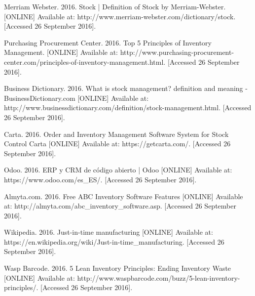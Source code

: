 \begin{thebibliography}{9}

Merriam Webster. 2016. Stock | Definition of Stock by Merriam-Webster. [ONLINE] Available at: http://www.merriam-webster.com/dictionary/stock. [Accessed 26 September 2016].

Purchasing Procurement Center. 2016. Top 5 Principles of Inventory Management. [ONLINE] Available at: http://www.purchasing-procurement-center.com/principles-of-inventory-management.html. [Accessed 26 September 2016].

Business Dictionary. 2016. What is stock management? definition and meaning - BusinessDictionary.com [ONLINE] Available at: http://www.businessdictionary.com/definition/stock-management.html. [Accessed 26 September 2016].

Carta. 2016. Order and Inventory Management Software System for Stock Control Carta [ONLINE] Available at: https://getcarta.com/. [Accessed 26 September 2016].

Odoo. 2016. ERP y CRM de código abierto | Odoo [ONLINE] Available at: https://www.odoo.com/es\_ES/. [Accessed 26 September 2016].

Almyta.com. 2016. Free ABC Inventory Software Features [ONLINE] Available at: http://almyta.com/abc\_inventory\_software.asp. [Accessed 26 September 2016].

Wikipedia. 2016. Just-in-time manufacturing [ONLINE] Available at: https://en.wikipedia.org/wiki/Just-in-time\_manufacturing. [Accessed 26 September 2016].

Wasp Barcode. 2016. 5 Lean Inventory Principles: Ending Inventory Waste [ONLINE] Available at: http://www.waspbarcode.com/buzz/5-lean-inventory-principles/. [Accessed 26 September 2016].

\end{thebibliography}